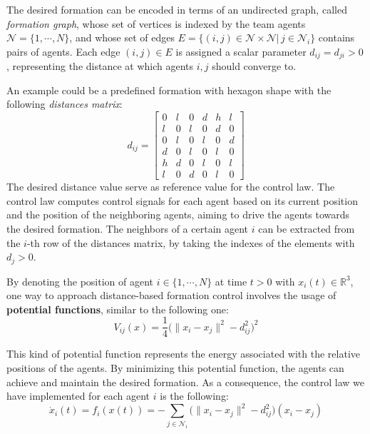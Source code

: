 \documentclass[a4paper,11pt,oneside]{book}
\begin{document}
\bigskip
The desired formation can be encoded in terms of an undirected graph, called \textit{formation graph}, whose set of vertices is indexed by the team agents $\mathcal{N} =\{ 1, \cdots, N\}$, and whose set of edges $E=\{(i,j) \in \mathcal{N} \times \mathcal{N} | \, j \in \mathcal{N}_i\}$ contains pairs of agents. Each edge $(i,j) \in E$ is assigned a scalar parameter $d_{ij} = d_{ji} > 0$, representing the distance at which agents $i,j$ should converge to. 

An example could be a predefined formation with hexagon shape with the following \textit{distances matrix}:
\begin{equation}
d_{ij} =
\begin{bmatrix}
0 & l & 0 & d & h & l \\
l & 0 & l & 0 & d & 0 \\
0 & l & 0 & l & 0 & d \\
d & 0 & l & 0 & l & 0 \\
h & d & 0 & l & 0 & l \\
l & 0 & d & 0 & l & 0
\end{bmatrix}
\end{equation}
The desired distance value serve as reference value for the control law. The control law computes control signals for each agent based on its current position and the position of the neighboring agents, aiming to drive the agents towards the desired formation.
The neighbors of a certain agent $i$ can be extracted from the $i$-th row of the distances matrix, by taking the indexes of the elements with $d_j > 0$.

By denoting the position of agent $i \in \{1, \cdots, N\}$ at time $t>0$ with $x_i(t) \in \mathbb{R}^3$, one way to approach distance-based formation control involves the usage of \textbf{potential functions}, similar to the following one:
\begin{equation}
V_{ij}(x)  = \frac{1}{4} \bigg( \lVert x_i - x_j \rVert^2 - d_{ij}^2 \bigg)^2
\label{Formation_potential}
\end{equation}

This kind of potential function represents the energy associated with the relative positions of the agents. By minimizing this potential function, the agents can achieve and maintain the desired formation.
As a consequence, the control law we have implemented for each agent $i$ is the following:
\begin{equation}
\dot{x}_i(t) = f_i(x(t)) = - \sum_{j \in \mathcal{N}_i} \bigg( \lVert x_i - x_j \rVert^2 - d_{ij}^2 \bigg) (x_i - x_j )
\label{Dynamics_no_collision_avoidance}
\end{equation}
\end{document}
